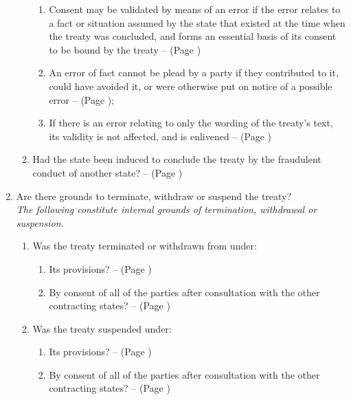 \begin{enumerate}
\begin{enumerate}
\begin{enumerate}
            \item Consent may be validated by means of an error if the error relates to a fact or situation assumed by the state that existed at the time when the treaty was concluded, and forms an essential basis of its consent to be bound by the treaty --  (Page \pageref{VCLT Art 48})
            \item An error of fact cannot be plead by a party if they contributed to it, could have avoided it, or were otherwise put on notice of a possible error --  (Page \pageref{VCLT Art 48}); 
            \item If there is an error relating to only the wording of the treaty's text, its validity is not affected, and  is enlivened --  (Page \pageref{VCLT Art 48})
        \end{enumerate}
        \item Had the state been induced to conclude the treaty by the fraudulent conduct of another state? --  (Page \pageref{VCLT Art 49})
    \end{enumerate}
    \item Are there grounds to terminate, withdraw or suspend the treaty? \\\vspace{8pt}
    \textit{The following constitute internal grounds of termination, withdrawal or suspension.}
    \begin{enumerate}
        \item Was the treaty terminated or withdrawn from under:
        \begin{enumerate}
            \item Its provisions? --  (Page \pageref{VCLT Art 54})
            \item By consent of all of the parties after consultation with the other contracting states? --  (Page \pageref{VCLT Art 54})
        \end{enumerate}
        \item Was the treaty suspended under:
        \begin{enumerate}
            \item Its provisions? --  (Page \pageref{VCLT Art 57})
            \item By consent of all of the parties after consultation with the other contracting states? --  (Page \pageref{VCLT Art 57})

\end{enumerate}
\end{enumerate}
\end{enumerate}

